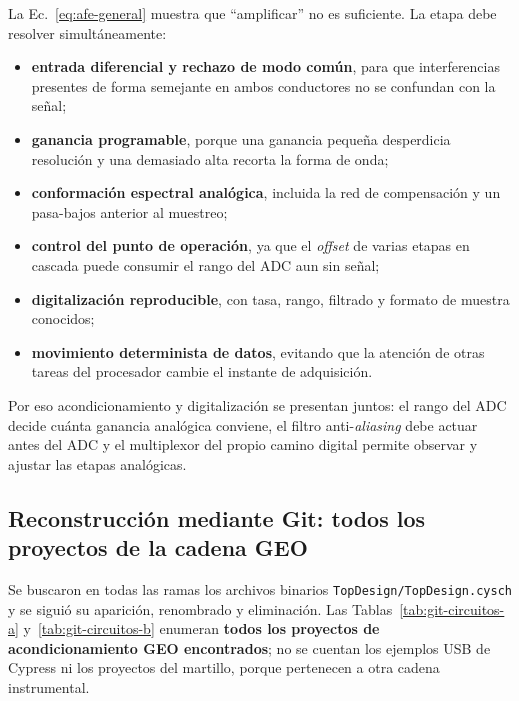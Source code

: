 La Ec.~\eqref{eq:afe-general} muestra que ``amplificar'' no es suficiente. La etapa debe
resolver simult\'aneamente:

\begin{itemize}
    \item \textbf{entrada diferencial y rechazo de modo com\'un}, para que interferencias
    presentes de forma semejante en ambos conductores no se confundan con la se\~nal;
    \item \textbf{ganancia programable}, porque una ganancia peque\~na desperdicia
    resoluci\'on y una demasiado alta recorta la forma de onda;
    \item \textbf{conformaci\'on espectral anal\'ogica}, incluida la red de compensaci\'on
    y un pasa-bajos anterior al muestreo;
    \item \textbf{control del punto de operaci\'on}, ya que el \emph{offset} de varias
    etapas en cascada puede consumir el rango del ADC aun sin se\~nal;
    \item \textbf{digitalizaci\'on reproducible}, con tasa, rango, filtrado y formato de
    muestra conocidos;
    \item \textbf{movimiento determinista de datos}, evitando que la atenci\'on de otras
    tareas del procesador cambie el instante de adquisici\'on.
\end{itemize}

Por eso acondicionamiento y digitalizaci\'on se presentan juntos: el rango del ADC decide
cu\'anta ganancia anal\'ogica conviene, el filtro anti-\emph{aliasing} debe actuar antes
del ADC y el multiplexor del propio camino digital permite observar y ajustar las etapas
anal\'ogicas.

\subsection{Reconstrucci\'on mediante Git: todos los proyectos de la cadena GEO}
\label{sec:git-topdesign}

Se buscaron en todas las ramas los archivos binarios
\texttt{TopDesign/TopDesign.cysch} y se sigui\'o su aparici\'on, renombrado y eliminaci\'on.
Las Tablas~\ref{tab:git-circuitos-a} y~\ref{tab:git-circuitos-b} enumeran
\textbf{todos los proyectos de acondicionamiento GEO encontrados}; no se cuentan los
ejemplos USB de Cypress ni los proyectos del martillo, porque pertenecen a otra cadena
instrumental.

